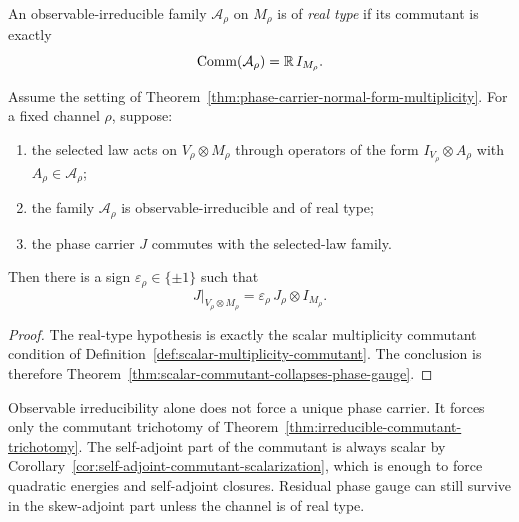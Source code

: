 \begin{definition}
\label{def:real-type-observable-channel}
An observable-irreducible family $\mathcal A_{\rho}$ on $M_{\rho}$ is of
\emph{real type} if its commutant is exactly
\[
\mathrm{Comm}(\mathcal A_{\rho})=\mathbb{R}\,I_{M_{\rho}}.
\]
\end{definition}

\begin{corollary}
\label{cor:real-type-irreducibility-collapses-phase-gauge}
Assume the setting of
Theorem~\ref{thm:phase-carrier-normal-form-multiplicity}. For a fixed channel
$\rho$, suppose:
\begin{enumerate}[label=(\roman*), leftmargin=2em, itemsep=0.2em]
\item the selected law acts on $V_{\rho}\otimes M_{\rho}$ through operators of
      the form $I_{V_{\rho}}\otimes A_{\rho}$ with
      $A_{\rho}\in\mathcal A_{\rho}$;
\item the family $\mathcal A_{\rho}$ is observable-irreducible and of real
      type;
\item the phase carrier $J$ commutes with the selected-law family.
\end{enumerate}
Then there is a sign $\varepsilon_{\rho}\in\{\pm1\}$ such that
\[
J|_{V_{\rho}\otimes M_{\rho}}
=
\varepsilon_{\rho}\,J_{\rho}\otimes I_{M_{\rho}}.
\]
\end{corollary}

\begin{proof}
The real-type hypothesis is exactly the scalar multiplicity commutant
condition of Definition~\ref{def:scalar-multiplicity-commutant}. The
conclusion is therefore Theorem~\ref{thm:scalar-commutant-collapses-phase-gauge}.
\end{proof}

\begin{remark}
\label{rem:irreducibility-versus-phase}
Observable irreducibility alone does not force a unique phase carrier. It
forces only the commutant trichotomy of
Theorem~\ref{thm:irreducible-commutant-trichotomy}. The self-adjoint part of
the commutant is always scalar by
Corollary~\ref{cor:self-adjoint-commutant-scalarization}, which is enough to
force quadratic energies and self-adjoint closures. Residual phase gauge can
still survive in the skew-adjoint part unless the channel is of real type.
\end{remark}

